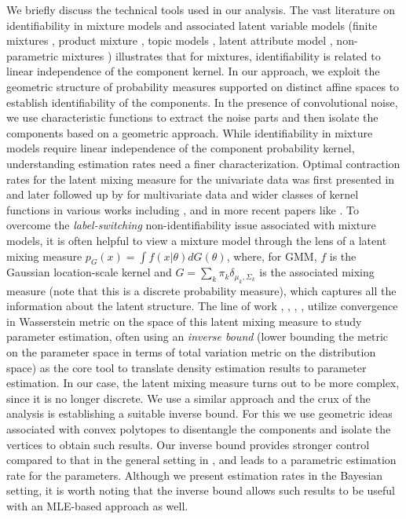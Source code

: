 \documentclass[bj,authoryear]{imsart}
\theoremstyle{plain}
\theoremstyle{remark}
\begin{document}
We briefly discuss the technical tools used in our analysis. The vast literature on identifiability in mixture models and associated latent variable models (finite mixtures \cite{teicher1961identifiability, teicher1967identifiability}, product mixture \cite{vandermeulen2015identifiability}, topic models \cite{anandkumar2012spectral}, latent attribute model \cite{gu2023identifiability}, non-parametric mixtures \cite{aragam2020identifiability}) illustrates that for mixtures, identifiability is related to linear independence of the component kernel. In our approach, we exploit the geometric structure of probability measures supported on distinct affine spaces to establish identifiability of the components. In the presence of convolutional noise, we use characteristic functions to extract the noise parts and then isolate the components based on a geometric approach. While identifiability in mixture models require linear independence of the component probability kernel, understanding estimation rates need a finer characterization. Optimal contraction rates for the latent mixing measure for the univariate data was first presented in \cite{chen1995optimal} and later followed up by for multivariate data and wider classes of kernel functions in various works including \cite{rousseau2011asymptotic}, \cite{ishwaran2001bayesian} and in more recent papers like \cite{ho2016strong}. To overcome the \textit{label-switching} non-identifiability issue associated with mixture models, it is often helpful to view a mixture model through the lens of a latent mixing measure $p_G(x) = \int f(x|\theta)dG(\theta)$, where, for GMM, $f$ is the Gaussian location-scale kernel and $G=\sum_k \pi_k \delta_{\mu_k,\Sigma_k}$ is the associated mixing measure (note that this is a discrete probability measure), which captures all the information about the latent structure. The line of work \cite{nguyen2013convergence}, \cite{nguyen2015posterior}, \cite{ho2016strong}, \cite{wei2020convergence}, \cite{guha2021posterior} utilize convergence in Wasserstein metric on the space of this latent mixing measure to study parameter estimation, often using an \textit{inverse bound} (lower bounding the metric on the parameter space in terms of total variation metric on the distribution space) as the core tool to translate density estimation results to parameter estimation. In our case, the latent mixing measure turns out to be more complex, since it is no longer discrete. We use a similar approach and the crux of the analysis is establishing a suitable inverse bound. For this we use geometric ideas associated with convex polytopes to disentangle the components and isolate the vertices to obtain such results. Our inverse bound provides stronger control compared to that in the general setting in \cite{nguyen2013convergence}, and leads to a parametric estimation rate for the parameters. Although we present estimation rates in the Bayesian setting, it is worth noting that the inverse bound allows such results to be useful with an MLE-based approach as well.
\end{document}
